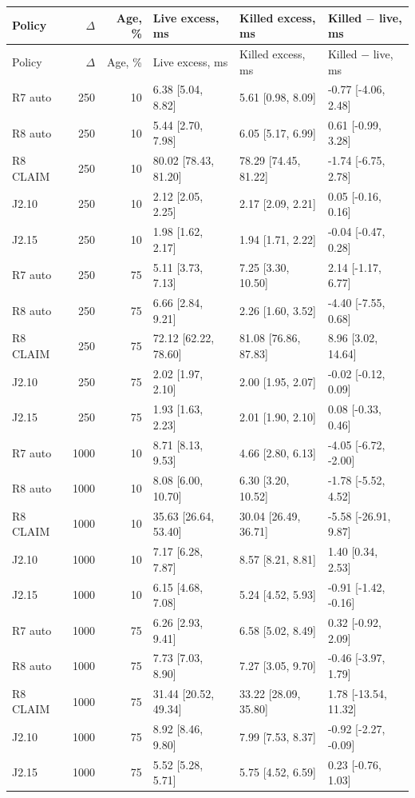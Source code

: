 \begin{longtable}{lrrlll}
\toprule
Policy & $\Delta$ & Age, \% & Live excess, ms & Killed excess, ms & Killed $-$ live, ms\\
\midrule
\endfirsthead
\toprule
Policy & $\Delta$ & Age, \% & Live excess, ms & Killed excess, ms & Killed $-$ live, ms\\
\midrule
\endhead
R7 auto & 250 & 10 & 6.38 [5.04, 8.82] & 5.61 [0.98, 8.09] & -0.77 [-4.06, 2.48]\\
R8 auto & 250 & 10 & 5.44 [2.70, 7.98] & 6.05 [5.17, 6.99] & 0.61 [-0.99, 3.28]\\
R8 CLAIM & 250 & 10 & 80.02 [78.43, 81.20] & 78.29 [74.45, 81.22] & -1.74 [-6.75, 2.78]\\
J2.10 & 250 & 10 & 2.12 [2.05, 2.25] & 2.17 [2.09, 2.21] & 0.05 [-0.16, 0.16]\\
J2.15 & 250 & 10 & 1.98 [1.62, 2.17] & 1.94 [1.71, 2.22] & -0.04 [-0.47, 0.28]\\
R7 auto & 250 & 75 & 5.11 [3.73, 7.13] & 7.25 [3.30, 10.50] & 2.14 [-1.17, 6.77]\\
R8 auto & 250 & 75 & 6.66 [2.84, 9.21] & 2.26 [1.60, 3.52] & -4.40 [-7.55, 0.68]\\
R8 CLAIM & 250 & 75 & 72.12 [62.22, 78.60] & 81.08 [76.86, 87.83] & 8.96 [3.02, 14.64]\\
J2.10 & 250 & 75 & 2.02 [1.97, 2.10] & 2.00 [1.95, 2.07] & -0.02 [-0.12, 0.09]\\
J2.15 & 250 & 75 & 1.93 [1.63, 2.23] & 2.01 [1.90, 2.10] & 0.08 [-0.33, 0.46]\\
R7 auto & 1000 & 10 & 8.71 [8.13, 9.53] & 4.66 [2.80, 6.13] & -4.05 [-6.72, -2.00]\\
R8 auto & 1000 & 10 & 8.08 [6.00, 10.70] & 6.30 [3.20, 10.52] & -1.78 [-5.52, 4.52]\\
R8 CLAIM & 1000 & 10 & 35.63 [26.64, 53.40] & 30.04 [26.49, 36.71] & -5.58 [-26.91, 9.87]\\
J2.10 & 1000 & 10 & 7.17 [6.28, 7.87] & 8.57 [8.21, 8.81] & 1.40 [0.34, 2.53]\\
J2.15 & 1000 & 10 & 6.15 [4.68, 7.08] & 5.24 [4.52, 5.93] & -0.91 [-1.42, -0.16]\\
R7 auto & 1000 & 75 & 6.26 [2.93, 9.41] & 6.58 [5.02, 8.49] & 0.32 [-0.92, 2.09]\\
R8 auto & 1000 & 75 & 7.73 [7.03, 8.90] & 7.27 [3.05, 9.70] & -0.46 [-3.97, 1.79]\\
R8 CLAIM & 1000 & 75 & 31.44 [20.52, 49.34] & 33.22 [28.09, 35.80] & 1.78 [-13.54, 11.32]\\
J2.10 & 1000 & 75 & 8.92 [8.46, 9.80] & 7.99 [7.53, 8.37] & -0.92 [-2.27, -0.09]\\
J2.15 & 1000 & 75 & 5.52 [5.28, 5.71] & 5.75 [4.52, 6.59] & 0.23 [-0.76, 1.03]\\
\bottomrule
\end{longtable}
